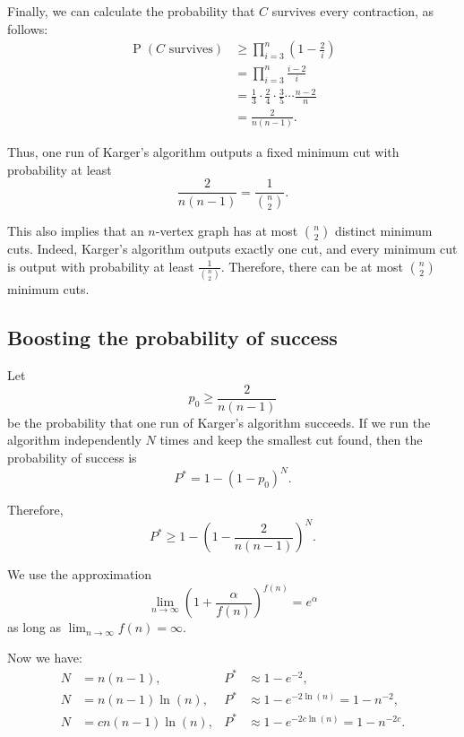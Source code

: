 \documentclass[14pt]{extreport}
\renewcommand{\Pr}[1]{\operatorname{P}\left(#1\right)}
\begin{document}
    Finally, we can calculate the probability that $C$ survives every contraction, as follows:
    \begin{align*}
        \Pr{\text{$C$ survives}}
        &\geq \prod_{i = 3}^{n} \left(1 - \frac{2}{i}\right) \\
        &= \prod_{i = 3}^{n} \frac{i - 2}{i} \\
        &= \frac{1}{3} \cdot \frac{2}{4} \cdot \frac{3}{5} \cdots \frac{n - 2}{n} \\
        &= \frac{2}{n(n - 1)}.
    \end{align*}

    Thus, one run of Karger's algorithm outputs a fixed minimum cut with probability at least
    $$
    \frac{2}{n(n - 1)} = \frac{1}{\binom{n}{2}}.
    $$

    This also implies that an $n$-vertex graph has at most $\binom{n}{2}$ distinct minimum cuts. Indeed, Karger's algorithm outputs exactly one cut, and every minimum cut is output with probability at least $\frac{1}{\binom{n}{2}}$. Therefore, there can be at most $\binom{n}{2}$ minimum cuts.

\subsection*{Boosting the probability of success}
    Let
    $$
    p_0 \geq \frac{2}{n(n - 1)}
    $$
    be the probability that one run of Karger's algorithm succeeds. If we run the algorithm independently $N$ times and keep the smallest cut found, then the probability of success is
    $$
    P^* = 1 - (1 - p_0)^N.
    $$

    \vspace{4mm}

    Therefore,
    $$
    P^* \geq 1 - \left(1 - \frac{2}{n(n - 1)}\right)^N.
    $$

    \vspace{4mm}

    We use the approximation
    $$
    \lim_{n \to \infty} \left(1 + \frac{\alpha}{f(n)}\right)^{f(n)} = e^\alpha
    $$
    as long as $\lim_{n \to \infty} f(n) = \infty$.

    \vspace{4mm}

    Now we have:
    \begin{align*}
        N &= n(n - 1), & P^* &\approx 1 - e^{-2}, \\
        N &= n(n - 1)\ln(n), & P^* &\approx 1 - e^{-2\ln(n)} = 1 - n^{-2}, \\
        N &= cn(n - 1)\ln(n), & P^* &\approx 1 - e^{-2c\ln(n)} = 1 - n^{-2c}.
    \end{align*}
\end{document}
